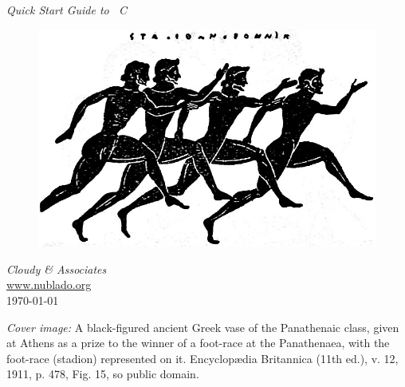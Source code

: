 \documentclass[12pt,twoside]{article}
\begin{document}

\begin{titlepage}
\begin{center}

\Huge
\emph{Quick Start Guide to \Cloudy\ C\VERSION}\\
\begin{figure}
\begin{center}
\includegraphics[clip=on,width=\columnwidth,height=0.7\textheight,keepaspectratio]{Greek_Foot-race_Panathenaic_Vase.jpg}
\end{center}
\label{fig:header}
\end{figure}

\LARGE

\vspace{15 mm }
\LARGE
\emph{Cloudy \& Associates} \\
\Large
\href{http://www.nublado.org}{www.nublado.org} \\
\normalsize
\today
\end{center}
\end{titlepage}

\clearpage

\vspace{5mm}
\noindent
{\small
{\em Cover image:}  A black-figured ancient Greek vase of the Panathenaic class, given at Athens as a prize to the winner of a foot-race at the Panathenaea, with the foot-race (stadion) represented on it.  Encyclop{\ae}dia Britannica (11th ed.), v. 12, 1911, p. 478, Fig. 15, so
public domain.}
\clearpage

\setcounter{tocdepth}{2}
\tableofcontents
\end{document}
